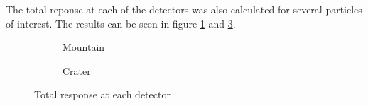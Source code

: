The total reponse at each of the detectors was also calculated for several particles 
of interest. The results can be seen in figure \ref{response_mountain} and \ref{response_crater}.

\begin{figure}
\centering
\begin{subfigure}[b]{.45\textwidth}
\caption{Mountain}
\label{response_mountain}
\end{subfigure}
%
\hspace{0.10cm}
%
\begin{subfigure}[b]{.4\textwidth}
\centering
{}
\caption{Crater}
\label{response_crater}
\end{subfigure}
\caption{Total response at each detector}
\end{figure}
